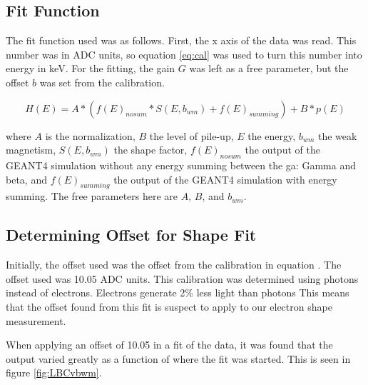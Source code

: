 \subsection{Fit Function}
The fit function used was as follows.
First, the x axis of the data was read.
This number was in ADC units, so equation \ref{eq:cal} was used to turn this number into energy in keV.
For the fitting, the gain $G$ was left as a free parameter, but the offset $b$ was set from the calibration.

\begin{equation}
	H(E) = A * (f(E)_{nosum} * S(E,b_{wm}) + f(E)_{summing}) + B*p(E)
	\label{eq:betafit}
\end{equation}

where $A$ is the normalization, $B$ the level of pile-up, $E$ the energy, $b_{wm}$ the weak magnetism, $S(E,b_{wm})$ the shape factor, $f(E)_{nosum}$ the output of the GEANT4 simulation without any energy summing between the ga:
Gamma and beta, and $f(E)_{summing}$ the output of the GEANT4 simulation with energy summing.
The free parameters here are $A$, $B$, and $b_{wm}$.

\subsection{Determining Offset for Shape Fit}

Initially, the offset used was the offset from the calibration  in equation \label{eq:cal}.
The offset used was 10.05 ADC units.
This calibration was determined using photons instead of electrons.
Electrons generate 2\% less light than photons \cite{REFHERE}
This means that the offset found from this fit is suspect to apply to our electron shape measurement.

When applying an offset of 10.05 in a fit of the data, it was found that the output varied greatly as a function of where the fit was started.
This is seen in figure \ref{fig:LBCvbwm}.


